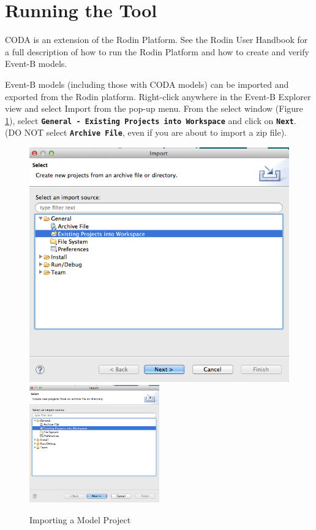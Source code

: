 \section{Running the Tool}
\label{sec:component_diagrams-running}

CODA is an extension of the Rodin Platform. See the Rodin User Handbook  for a full description of how to run the Rodin Platform and how to create and verify Event-B models.


Event-B models (including those with CODA models) can be imported and exported from the Rodin platform. Right-click anywhere in the Event-B Explorer view and select Import from the pop-up menu.
From the select window (Figure \ref{fig:ImportingaModelProject}), select \textbf{\texttt{General - Existing Projects into Workspace}} and click on \textbf{\texttt{Next}}. (DO NOT select \textbf{\texttt{Archive File}}, even if you are about to import a zip file).
 

\begin{figure}[!htbp]
  \centering
  \ifplastex
  \includegraphics[width=512]{figures/image2.png}
  \else
  \includegraphics[width=0.5\textwidth]{figures/image2.png}
  \fi
  \caption{Importing a Model Project}
  \label{fig:ImportingaModelProject}
\end{figure}


